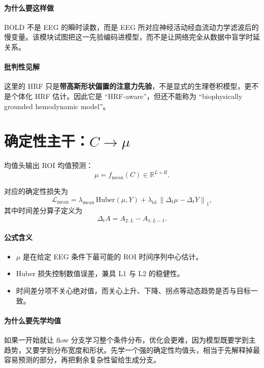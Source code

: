 \documentclass[11pt,a4paper]{ctexart}
\newcommand{\R}{\mathbb{R}}
\begin{document}
\paragraph{为什么要这样做}
BOLD 不是 EEG 的瞬时读数，而是 EEG 所对应神经活动经血流动力学滤波后的慢变量。该模块试图把这一先验编码进模型，而不是让网络完全从数据中盲学时延关系。

\paragraph{批判性见解}
这里的 HRF 只是\textbf{带高斯形状偏置的注意力先验}，不是显式的生理卷积模型，更不是个体化 HRF 估计。因此它是 ``HRF-aware''，但还不能称为 ``biophysically grounded hemodynamic model''。

\section{确定性主干：$C \rightarrow \mu$}

均值头输出 ROI 均值预测：
\begin{equation}
\mu = f_{\mathrm{mean}}(C) \in \R^{L \times R}.
\end{equation}

对应的确定性损失为
\begin{equation}
\mathcal{L}_{\mathrm{mean}}
=
\lambda_{\mathrm{mean}}\,\mathrm{Huber}(\mu, Y)
+
\lambda_{\mathrm{td}}\,
\left\|\Delta_t \mu - \Delta_t Y\right\|_1,
\end{equation}
其中时间差分算子定义为
\begin{equation}
\Delta_t A = A_{2:L} - A_{1:L-1}.
\end{equation}

\paragraph{公式含义}
\begin{itemize}
  \item $\mu$ 是在给定 EEG 条件下最可能的 ROI 时间序列中心估计。
  \item Huber 损失控制数值误差，兼具 L1 与 L2 的稳健性。
  \item 时间差分项不关心绝对值，而关心上升、下降、拐点等动态趋势是否与目标一致。
\end{itemize}

\paragraph{为什么要先学均值}
如果一开始就让 flow 分支学习整个条件分布，优化会更难，因为模型既要学到主趋势，又要学到分布宽度和形状。先学一个强的确定性均值头，相当于先解释掉最容易预测的部分，再把剩余复杂性留给生成分支。
\end{document}

